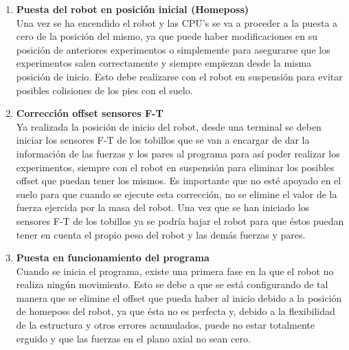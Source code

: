 \begin{enumerate}



\item \textbf{Puesta del robot en posición inicial (Homeposs)}\\ Una vez se ha encendido el robot y las CPU's se va a proceder a la puesta a cero de la posición del mismo, ya que puede haber modificaciones en su posición de anteriores experimentos o simplemente para asegurarse que los experimentos salen correctamente y siempre empiezan desde la misma posición de inicio. Esto debe realizarse con el robot en suspensión para evitar posibles colisiones de los pies con el suelo.

\item \textbf{Corrección offset sensores F-T}\\ Ya realizada la posición de inicio del robot, desde una terminal se deben iniciar los sensores F-T de los tobillos que se van a encargar de dar la información de las fuerzas y los pares al programa para así poder realizar los experimentos, siempre con el robot en suspensión para eliminar los posibles offset que puedan tener los mismos. Es importante que no esté apoyado en el suelo para que cuando se ejecute esta corrección, no se elimine el valor de la fuerza ejercida por la masa del robot. Una vez que se han iniciado los sensores F-T de los tobillos ya se podría bajar el robot para que éstos puedan tener en cuenta el propio peso del robot y las demás fuerzas y pares. 

\newpage

\item \textbf{Puesta en funcionamiento del programa}\\ Cuando se inicia el programa, existe una primera fase en la que el robot no realiza ningún movimiento. Esto se debe a que se está configurando de tal manera que se elimine el offset que pueda haber al inicio debido a la posición de homeposs del robot, ya que ésta no es perfecta y, debido a la flexibilidad de la estructura y otros errores acumulados, puede no estar totalmente erguido y que las fuerzas en el plano axial no sean cero. 


\end{enumerate}

